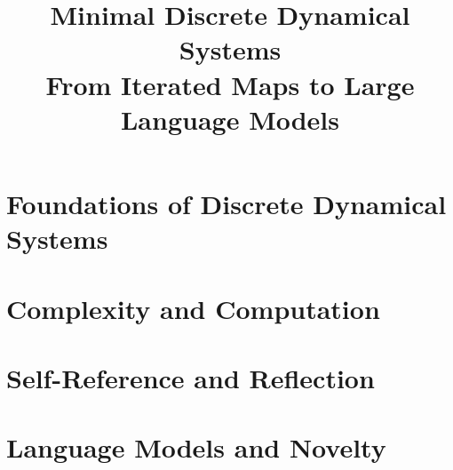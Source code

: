 \documentclass[11pt,a4paper]{book}
\title{\Huge\textbf{Minimal Discrete Dynamical Systems}\\[0.5em]
\Large From Iterated Maps to Large Language Models}
\author{}
\date{}
\theoremstyle{definition}
\theoremstyle{plain}
\begin{document}
\frontmatter
\maketitle

\tableofcontents

\mainmatter

\part{Foundations of Discrete Dynamical Systems}









\part{Complexity and Computation}





\part{Self-Reference and Reflection}





\part{Language Models and Novelty}





\backmatter

% 
% 
\end{document}
